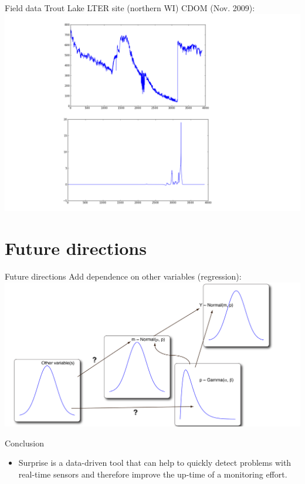 \documentclass{beamer}
\begin{document}
\begin{frame}{Field data}
	Trout Lake LTER site (northern WI) CDOM (Nov. 2009):
	\includegraphics[width=\textwidth]{../../figures/troutlake}
\end{frame}


\section{Future directions}

\begin{frame}{Future directions}
	Add dependence on other variables (regression):\\
	\includegraphics[width=\textwidth]{../../figures/hierarchical-regression}
\end{frame}


\begin{frame}{Conclusion}
	\begin{itemize}
		\item Surprise is a data-driven tool that can help to quickly detect problems with real-time sensors and therefore improve the up-time of a monitoring effort.
	\end{itemize}
\end{frame}
\end{document}
